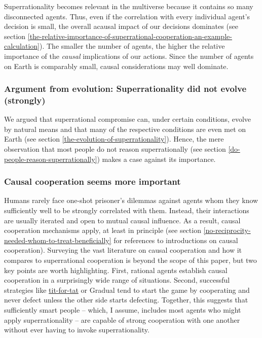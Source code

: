 Superrationality becomes relevant in the multiverse because it contains
so many disconnected agents. Thus, even if the correlation with every
individual agent's decision is small, the overall acausal impact of our
decisions dominates (see section
\ref{the-relative-importance-of-superrational-cooperation-an-example-calculation}). The smaller the number of agents, the higher the
relative importance of the \emph{causal} implications of our actions.
Since the number of agents on Earth is comparably small, causal
considerations may well dominate.

\subsubsection{Argument from evolution: Superrationality did not evolve
(strongly)}\label{argument-from-evolution-superrationality-did-not-evolve-strongly}

We argued that superrational compromise can, under certain conditions,
evolve by natural means and that many of the respective conditions are
even met on Earth (see section
\ref{the-evolution-of-superrationality}). Hence, the mere observation that
most people do not reason superrationally (see section
\ref{do-people-reason-superrationally}) makes a case against its importance.

\subsubsection{Causal cooperation seems more
important}\label{causal-cooperation-seems-more-important}

Humans rarely face one-shot prisoner's dilemmas
against agents whom they know sufficiently well to be strongly correlated with them.
Instead, their interactions are
usually iterated and open to mutual causal influence. As a result,
causal cooperation mechanisms apply, at least in principle (see section
\ref{no-reciprocity-needed-whom-to-treat-beneficially} for references to introductions on causal cooperation).
Surveying the vast literature on causal cooperation and how it compares
to superrational cooperation is beyond the scope of this paper, but two
key points are worth highlighting. First, rational agents establish
causal cooperation in a surprisingly wide range of situations. Second,
successful strategies like
\href{https://en.wikipedia.org/wiki/Tit_for_tat}{tit-for-tat} or
Gradual \parencite{Beaufils1997-mi} tend to start the game
by cooperating and never defect unless the other side starts defecting.
Together, this suggests that sufficiently smart people -- which, I
assume, includes most agents who might apply superrationality -- are
capable of strong cooperation with one another without ever having to
invoke superrationality.


